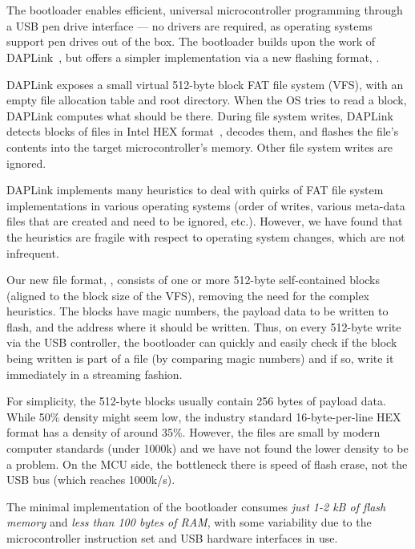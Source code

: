 \section{\UF}
\label{sec:uf2}

The \UF bootloader enables efficient, universal microcontroller programming through a USB pen drive interface --- no drivers are required, as operating systems support pen drives out of the box. The \UF bootloader builds upon the work of DAPLink~\cite{GitHubAR5:online}, but offers a simpler implementation via a new flashing format, \UFN.

DAPLink exposes a small virtual 512-byte block FAT file system (VFS), with an empty file allocation table and root directory. When the OS tries to read a block, DAPLink computes what should be there. During file system writes, DAP\-Link detects blocks of files in Intel HEX format~\cite{IntelHEX}, decodes them, and flashes the file's contents into the target microcontroller's memory. Other file system writes are ignored.

DAPLink implements many heuristics to deal with quirks of FAT file
system implementations in various operating systems (order of writes, various meta-data files that are created and need to be ignored, etc.).  However, we have found that the heuristics are fragile with respect to operating system changes, which are not infrequent.

Our new file format, \UFN, consists of one or more 512-byte self-contained blocks (aligned to the block size of the VFS), removing the need for the complex heuristics. The blocks have magic numbers, the payload data to be written to flash, and the address where it should be written. Thus, on every 512-byte write via the USB controller, the bootloader can quickly and easily check if the block being written is part of a \UF file (by comparing magic numbers) and if so, write it immediately in a streaming fashion.

For simplicity, the 512-byte \UF blocks usually contain 256 bytes of payload data. While 50\% density might seem low, the industry standard 16-byte-per-line HEX format has a density of around 35\%. However, the files are small by modern computer standards (under 1000k) and we have not found the lower density to be a problem. On the MCU side, the bottleneck there is speed of flash erase, not the USB bus (which reaches 1000k/s).

The minimal implementation of the \UF bootloader consumes \emph{just 1-2 kB of flash memory} and \emph{less than 100 bytes of RAM}, with some variability due to the microcontroller instruction set and USB hardware interfaces in use.

